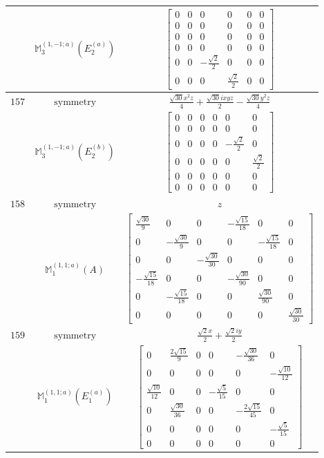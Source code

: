 \documentclass[fleqn,8pt,landscape]{jsarticle}
\begin{document}
\begin{longtable}{ccc}
$  $ & $ \mathbb{M}_{3}^{(1,-1;a)}(E_{2}^{(a)}) $ & $ \begin{bmatrix} 0 & 0 & 0 & 0 & 0 & 0 \\ 0 & 0 & 0 & 0 & 0 & 0 \\ 0 & 0 & 0 & 0 & 0 & 0 \\ 0 & 0 & 0 & 0 & 0 & 0 \\ 0 & 0 & - \frac{\sqrt{2}}{2} & 0 & 0 & 0 \\ 0 & 0 & 0 & \frac{\sqrt{2}}{2} & 0 & 0 \end{bmatrix} $ \\ \hline
$ 157 $ & $ \text{symmetry} $ & $ \frac{\sqrt{30} x^{2} z}{4} + \frac{\sqrt{30} i x y z}{2} - \frac{\sqrt{30} y^{2} z}{4} $ \\
$  $ & $ \mathbb{M}_{3}^{(1,-1;a)}(E_{2}^{(b)}) $ & $ \begin{bmatrix} 0 & 0 & 0 & 0 & 0 & 0 \\ 0 & 0 & 0 & 0 & 0 & 0 \\ 0 & 0 & 0 & 0 & - \frac{\sqrt{2}}{2} & 0 \\ 0 & 0 & 0 & 0 & 0 & \frac{\sqrt{2}}{2} \\ 0 & 0 & 0 & 0 & 0 & 0 \\ 0 & 0 & 0 & 0 & 0 & 0 \end{bmatrix} $ \\ \hline
$ 158 $ & $ \text{symmetry} $ & $ z $ \\
$  $ & $ \mathbb{M}_{1}^{(1,1;a)}(A) $ & $ \begin{bmatrix} \frac{\sqrt{30}}{9} & 0 & 0 & - \frac{\sqrt{15}}{18} & 0 & 0 \\ 0 & - \frac{\sqrt{30}}{9} & 0 & 0 & - \frac{\sqrt{15}}{18} & 0 \\ 0 & 0 & - \frac{\sqrt{30}}{30} & 0 & 0 & 0 \\ - \frac{\sqrt{15}}{18} & 0 & 0 & - \frac{\sqrt{30}}{90} & 0 & 0 \\ 0 & - \frac{\sqrt{15}}{18} & 0 & 0 & \frac{\sqrt{30}}{90} & 0 \\ 0 & 0 & 0 & 0 & 0 & \frac{\sqrt{30}}{30} \end{bmatrix} $ \\ \hline
$ 159 $ & $ \text{symmetry} $ & $ \frac{\sqrt{2} x}{2} + \frac{\sqrt{2} i y}{2} $ \\
$  $ & $ \mathbb{M}_{1}^{(1,1;a)}(E_{1}^{(a)}) $ & $ \begin{bmatrix} 0 & \frac{2 \sqrt{15}}{9} & 0 & 0 & - \frac{\sqrt{30}}{36} & 0 \\ 0 & 0 & 0 & 0 & 0 & - \frac{\sqrt{10}}{12} \\ \frac{\sqrt{10}}{12} & 0 & 0 & - \frac{\sqrt{5}}{15} & 0 & 0 \\ 0 & \frac{\sqrt{30}}{36} & 0 & 0 & - \frac{2 \sqrt{15}}{45} & 0 \\ 0 & 0 & 0 & 0 & 0 & - \frac{\sqrt{5}}{15} \\ 0 & 0 & 0 & 0 & 0 & 0 \end{bmatrix} $ \\ \hline

\end{longtable}
\end{document}

